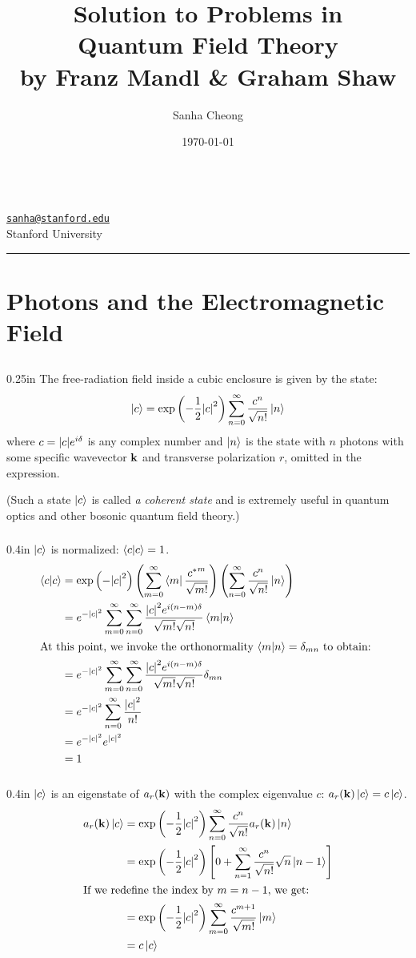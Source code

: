 \documentclass[letterpaper,12pt]{article}
\title{
	\huge{Solution to Problems in\\Quantum Field Theory}\\
	\vspace{0.1in}
	\Large{by Franz Mandl \& Graham Shaw}
}
\author{Sanha Cheong}
\date{\today}
\makeatletter
\newcommand{\linia}{\rule{\linewidth}{0.5pt}}
\def\email{\texttt{\href{mailto:sanha@stanford.edu}{sanha@stanford.edu}}}
\def\institution{Stanford University}
\renewcommand{\maketitle}{
\begin{center}
\textsc{\@title}
\end{center}
\vspace{2ex}
\Large{\@author} \hfill \Large{\@date}		\\
\large{\email}	\hfill	$ $			\\
\large{\institution}
\\
\linia
}
\newenvironment{problem}{\subsection{}\begin{adjustwidth}{0.25in}{}\vspace{-\baselineskip}}{\end{adjustwidth}}
\newenvironment{subproblem}{\subsubsection{}\begin{adjustwidth}{0.4in}{}\vspace{-\baselineskip}}{\end{adjustwidth}}
\makeatother
\begin{document}
\maketitle

\section{Photons and the Electromagnetic Field}

\begin{problem}
The free-radiation field inside a cubic enclosure is given by the state:
\begin{equation*}
\ket{c} = \exp\left(-\frac{1}{2}\abs{c}^2\right)
\sum_{n=0}^{\infty} \frac{c^n}{\sqrt{n!}} \ket{n}
\end{equation*}
where $c=\abs{c}e^{i\delta}$ is any complex number and $\ket{n}$ is the state with $n$ photons with some specific wavevector $\vb{k}$ and transverse polarization $r$, omitted in the expression.

(Such a state $\ket{c}$ is called \emph{a coherent state} and is extremely useful in quantum optics and other bosonic quantum field theory.)

\begin{subproblem}
	$\ket{c}$ is normalized: $\braket{c}{c}=1$.
	\begin{align*}
		\braket{c}{c}
		&= \exp\left(-\abs{c}^2\right)
		\left(\sum_{m=0}^{\infty}\bra{m}\frac{{c^*}^m}{\sqrt{m!}}\right)
		\left(\sum_{n=0}^{\infty}\frac{c^n}{\sqrt{n!}}\ket{n}\right)	\\
		&= e^{-\abs{c}^2}
		\sum_{m=0}^{\infty}\sum_{n=0}^{\infty}
		\frac{\abs{c}^2 e^{i(n-m)\delta}}{\sqrt{m!}\sqrt{n!}}\braket{m}{n}	\\
	\intertext{At this point, we invoke the orthonormality $\braket{m}{n}=\delta_{mn}$ to obtain: }
		&= e^{-\abs{c}^2}
		\sum_{m=0}^{\infty}\sum_{n=0}^{\infty}
		\frac{\abs{c}^2 e^{i(n-m)\delta}}{\sqrt{m!}\sqrt{n!}} \delta_{mn}	\\
		&= e^{-\abs{c}^2} \sum_{n=0}^{\infty} \frac{\abs{c}^2}{n!}	\\
		&= e^{-\abs{c}^2} e^{\abs{c}^2}	\\
		&=1		 
	\end{align*}
\end{subproblem}

\begin{subproblem}
	$\ket{c}$ is an eigenstate of $a_r(\vb{k})$ with the complex eigenvalue $c$: $a_r(\vb{k}) \ket{c} = c\ket{c}$.
	\begin{align*}
		a_r(\vb{k}) \ket{c} &=
		\exp\left(-\frac{1}{2}\abs{c}^2\right)
		\sum_{n=0}^{\infty} \frac{c^n}{\sqrt{n!}} a_r(\vb{k})\ket{n}	\\
		&= \exp\left(-\frac{1}{2}\abs{c}^2\right)
		\left[0 + \sum_{n=1}^{\infty} \frac{c^n}{\sqrt{n!}} \sqrt{n}\ket{n-1}\right]	\\
	\intertext{If we redefine the index by $m=n-1$, we get:}
		&= \exp\left(-\frac{1}{2}\abs{c}^2\right)
		\sum_{m=0}^{\infty} \frac{c^{m+1}}{\sqrt{m!}} \ket{m}	\\
		&= c\ket{c}		 
	\end{align*}
\end{subproblem}


\end{problem}
\end{document}
